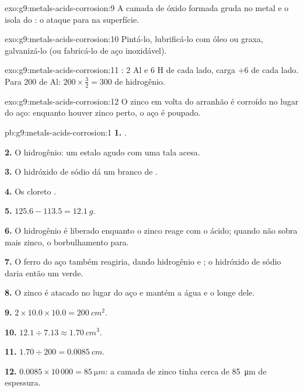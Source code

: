 \begin{solution}{exo:g9:metals-acids-corrosion:9}
A camada de óxido formada gruda no metal e o isola do : o ataque para
na superfície.
\end{solution}

\begin{solution}{exo:g9:metals-acids-corrosion:10}
Pintá-lo, lubrificá-lo com óleo ou graxa, galvanizá-lo (ou fabricá-lo de aço inoxidável).
\end{solution}

\begin{solution}{exo:g9:metals-acids-corrosion:11}
: 2 Al e 6 H de cada lado,
carga $+6$ de cada lado. Para 200  de Al: $200 \times \frac{3}{2} = 300$
 de hidrogênio.
\end{solution}

\begin{solution}{exo:g9:metals-acids-corrosion:12}
O zinco em volta do arranhão é corroído no lugar do aço: enquanto
houver zinco perto, o aço é poupado.
\end{solution}

\begin{solution}{pb:g9:metals-acids-corrosion:1}
\textbf{1.} .

\textbf{2.} O hidrogênio: um estalo agudo com uma tala acesa.

\textbf{3.} O hidróxido de sódio dá um  branco de
.

\textbf{4.} Os  cloreto .

\textbf{5.} $125.6 - 113.5 = \qty{12.1}{g}$.

\textbf{6.} O hidrogênio é liberado enquanto o zinco reage com o ácido;
quando não sobra mais zinco, o borbulhamento para.

\textbf{7.} O ferro do aço também reagiria, dando hidrogênio e 
; o hidróxido de sódio daria então um  verde.

\textbf{8.} O zinco é atacado no lugar do aço e mantém a água e o 
longe dele.

\textbf{9.} $2 \times 10.0 \times 10.0 = \qty{200}{cm^2}$.

\textbf{10.} $12.1 \div 7.13 \approx \qty{1.70}{cm^3}$.

\textbf{11.} $1.70 \div 200 = \qty{0.0085}{cm}$.

\textbf{12.} $0.0085 \times 10\,000 = \qty{85}{\micro m}$: a camada de
zinco tinha cerca de \qty{85}{\micro m} de espessura.
\end{solution}
